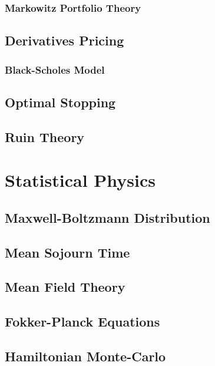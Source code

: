 \documentclass[11pt]{report} %
\begin{document}
\subsection{Markowitz Portfolio Theory}

\section{Derivatives Pricing}

\subsection{Black-Scholes Model}

\section{Optimal Stopping}

\section{Ruin Theory}

\chapter{Statistical Physics}

\section{Maxwell-Boltzmann Distribution}

\section{Mean Sojourn Time}

\section{Mean Field Theory}

\section{Fokker-Planck Equations}

\section{Hamiltonian Monte-Carlo}

{}

\end{document}
